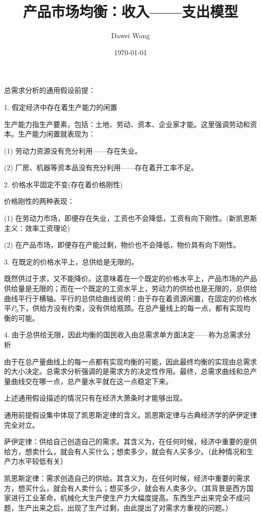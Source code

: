 \documentclass{article}
\title{产品市场均衡：收入——支出模型}
\author{Dawei Wang}
\date{\today}
\begin{document}
	\maketitle
总需求分析的通用假设前提：

1. 假定经济中存在着生产能力的闲置

生产能力指生产要素，包括：土地、劳动、资本、企业家才能。这里强调劳动和资本。生产能力闲置就表现为：

(1) 劳动力资源没有充分利用——存在失业。

(2) 厂房、机器等资本品没有充分利用——存在着开工率不足。

\hspace*{\fill}

2. 价格水平固定不变(存在着价格刚性)

价格刚性的两种表现：

(1) 在劳动力市场，即便存在失业，工资也不会降低，工资有向下刚性。(新凯恩斯主义：效率工资理论)

(2) 在产品市场，即便存在产能过剩，物价也不会降低，物价具有向下刚性。

\hspace*{\fill}

3. 在既定的价格水平上，总供给是无限的。

既然供过于求，又不能降价。这意味着在一个既定的价格水平上，产品市场的产品供给量是无限的；而在一个既定的工资水平上，劳动力的供给也是无限的，总供给曲线平行于横轴。平行的总供给曲线说明：由于存在着资源闲置，在固定的价格水平$ P_0 $下，供给方没有约束，没有供给瓶颈。在总产量线上的每一点，都有实现均衡的可能。

\hspace*{\fill}

4. 由于总供给无限，因此均衡的国民收入由总需求单方面决定——称为总需求分析

由于在总产量曲线上的每一点都有实现均衡的可能，因此最终均衡的实现由总需求的大小决定。总需求分析强调的是需求方的决定性作用。最终，总需求曲线和总产量曲线交在哪一点，总产量水平就在这一点稳定下来。

\hspace*{\fill}

上述通用假设描述的情况只有在经济大萧条时才能够出现。

通用前提假设集中体现了凯恩斯定律的含义。凯恩斯定律与古典经济学的萨伊定律完全对立。

萨伊定律：供给自己创造自己的需求。其含义为，在任何时候，经济中重要的是供给方，想卖什么，就会有人买什么；想卖多少，就会有人买多少。（此种情况和生产力水平较低有关）

凯恩斯定律：需求创造自己的供给。其含义为，在任何时候，经济中重要的需求方，想买什么，就会有人卖什么；想买多少，就会有人卖多少。（其背景是西方国家进行工业革命，机械化大生产使生产力大幅度提高。东西生产出来完全不成问题，生产出来之后，出现了生产过剩，由此提出了对需求方重视的问题。）
\end{document}
